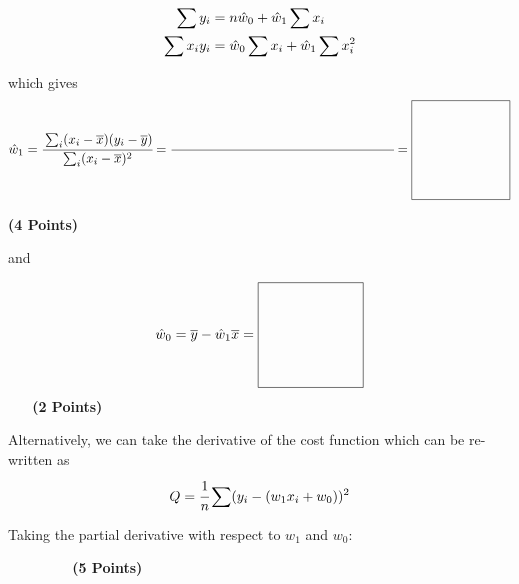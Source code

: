 \documentclass[12pt, xcolor=dvipsnames,svgnames,x11names]{article}
\begin{document}
\begin{equation}
    \begin{aligned}
    \sum y_i & = n{\hat w}_0 + {\hat w}_1 \sum x_i\\
    \sum x_i y_i & = {\hat w}_0 \sum x_i + {\hat w}_1 \sum x_i^2
    \end{aligned}
\end{equation}

which gives 
\begin{equation}
    \what_1 = \cfrac{\sum_i (x_i - \xbar)(y_i - \ybar)}{\sum_i (x_i  - \xbar)^2} = \cfrac{\quad\quad\quad\quad\quad\quad\quad\quad\quad\quad\quad\quad\quad\quad\quad\quad\quad}{\quad\quad\quad\quad\quad\quad\quad\quad\quad\quad\quad\quad\quad\quad\quad\quad\quad} = \vcenter{\hbox{\begin{tikzpicture}
    \draw (0,0) rectangle (75pt,75pt);
    \end{tikzpicture}}}
\end{equation}

\textbf{(4 Points)}

and

\begin{equation}
    \what_0 = \ybar - \what_1 \xbar = \vcenter{\hbox{\begin{tikzpicture}
    \draw (0,0) rectangle (75pt,75pt);
    \end{tikzpicture}}} 
\end{equation}
\textbf{~~~(2 Points)}



Alternatively, we can take the derivative of the cost function which can be re-written as
\begin{equation}
    Q = \cfrac{1}{n} \sum ( y_i - (w_1x_i + w_0))^2
\end{equation}

Taking the partial derivative with respect to $w_1$ and $w_0$:

\begin{figure}[h]
\textbf{~~~(5 Points)}
\end{figure}
\end{document}
